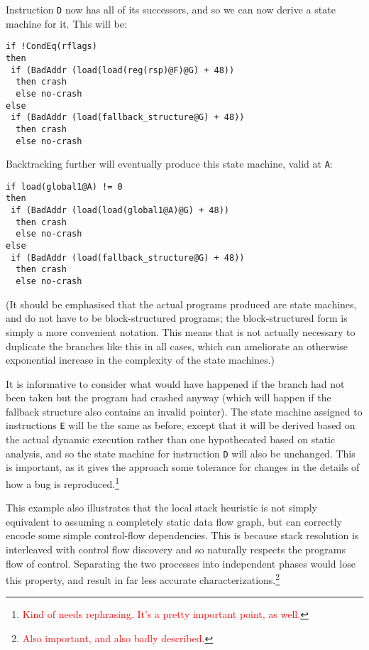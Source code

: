 \documentclass[10pt,twocolumn,preprint,natbib,authoryear]{sigplanconf}
\newcommand{\editorial}[1]{\textcolor{red}{\footnote{\textcolor{red}{#1}}}}
\begin{document}
Instruction \verb|D| now has all of its successors, and so we can
now derive a state machine for it.  This will be:

\begin{verbatim}
if !CondEq(rflags)
then
 if (BadAddr (load(load(reg(rsp)@F)@G) + 48))
  then crash
  else no-crash
else
 if (BadAddr (load(fallback_structure@G) + 48))
  then crash
  else no-crash
\end{verbatim}

Backtracking further will eventually produce this state machine, valid
at \verb|A|:

\begin{verbatim}
if load(global1@A) != 0
then
 if (BadAddr (load(load(global1@A)@G) + 48))
  then crash
  else no-crash
else
 if (BadAddr (load(fallback_structure@G) + 48))
  then crash
  else no-crash
\end{verbatim}

(It should be emphasised that the actual programs produced are state
machines, and do not have to be block-structured programs; the
block-structured form is simply a more convenient notation.  This
means that is not actually necessary to duplicate the branches like
this in all cases, which can ameliorate an otherwise exponential
increase in the complexity of the state machines.)

It is informative to consider what would have happened if the branch
had not been taken but the program had crashed anyway (which will
happen if the fallback structure also contains an invalid pointer).
The state machine assigned to instructions \verb|E| will be the same
as before, except that it will be derived based on the actual dynamic
execution rather than one hypothecated based on static analysis, and
so the state machine for instruction \verb|D| will also be unchanged.
This is important, as it gives the approach some tolerance for changes
in the details of how a bug is reproduced.\editorial{Kind of needs
  rephrasing.  It's a pretty important point, as well.}

This example also illustrates that the local stack heuristic is not
simply equivalent to assuming a completely static data flow graph, but
can correctly encode some simple control-flow dependencies.  This is
because stack resolution is interleaved with control flow discovery
and so naturally respects the programs flow of control.  Separating
the two processes into independent phases would lose this property,
and result in far less accurate characterizations.\editorial{Also
  important, and also badly described.}
\end{document}
